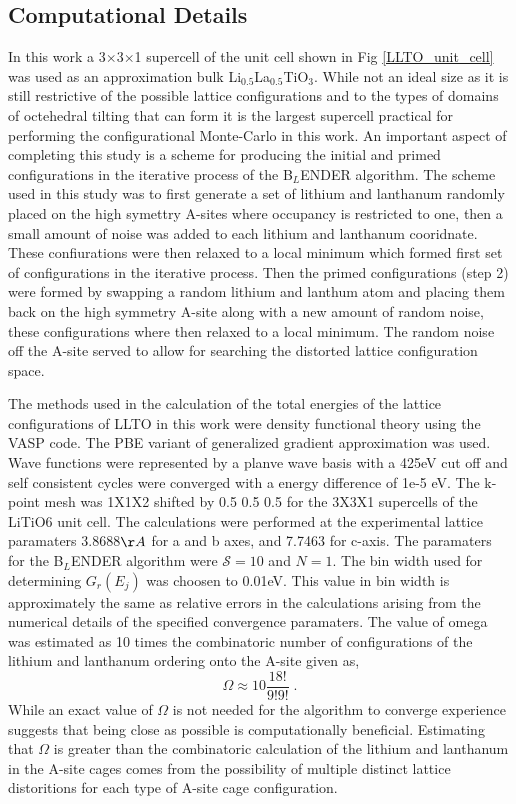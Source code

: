\documentclass[aps,prl,reprint,superscriptaddress,showkeys]{revtex4-1}
\begin{document}
\subsection{Computational Details}
In this work a 3$\times$3$\times$1 supercell of the unit cell shown in Fig \ref{LLTO_unit_cell} was used as an approximation bulk Li$_{0.5}$La$_{0.5}$TiO$_{3}$. While not an ideal size as it is still restrictive of the possible lattice configurations and to the types of domains of octehedral tilting that can form it is the largest supercell practical for performing the configurational Monte-Carlo in this work. An important aspect of completing this study is a scheme for producing the initial and primed configurations in the iterative process of the B$_L$ENDER algorithm. The scheme used in this study was to first generate a set of lithium and lanthanum randomly placed on the high symettry A-sites where occupancy is restricted to one, then a small amount of noise was added to each lithium and lanthanum cooridnate. These confiurations were then relaxed to a local minimum which formed first set of configurations in the iterative process.  Then the primed configurations (step 2) were formed by swapping a random lithium and lanthum atom and placing them back on the high symmetry A-site along with a new amount of random noise, these configurations where then relaxed to a local minimum. The random noise off the A-site served to allow for searching the distorted lattice configuration space. 

The methods used in the calculation of the total energies of the lattice configurations of LLTO in this work were density functional theory using the VASP code. The PBE variant of generalized gradient approximation was used.  Wave functions were represented by a planve wave basis with a 425eV cut off and self consistent cycles were converged with a energy difference of 1e-5 eV. The k-point mesh was 1X1X2 shifted by 0.5 0.5 0.5 for the 3X3X1 supercells of the LiTiO6 unit cell. The calculations were performed at the experimental lattice paramaters 3.8688$\AA$ for a and b axes, and 7.7463 for c-axis. The paramaters for the B$_L$ENDER algorithm were $\mathcal{S}=10$ and $N=1$. The bin width used for determining $G_r(E_j)$ was choosen to 0.01eV. This value in bin width is approximately the same as relative errors in the calculations arising from the numerical details of the specified convergence paramaters. The value of omega was estimated as 10 times the combinatoric number of configurations of the lithium and lanthanum ordering onto the A-site  given as, 
\begin{equation}
\Omega \approx 10\frac{18!}{9!9!} \;.
\end{equation}
While an exact value of $\Omega$ is not needed for the algorithm to converge experience suggests that being close as possible is computationally beneficial. Estimating that $\Omega$ is greater than the combinatoric calculation of the lithium and lanthanum in the A-site cages comes from the possibility of multiple distinct lattice distoritions for each type of A-site cage configuration. 
\end{document}
